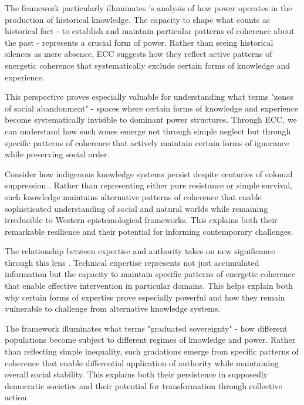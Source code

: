 The framework particularly illuminates \cite{trouillot1995silencing}'s analysis of how power operates in the production of historical knowledge. The capacity to shape what counts as historical fact - to establish and maintain particular patterns of coherence about the past - represents a crucial form of power. Rather than seeing historical silences as mere absence, ECC suggests how they reflect active patterns of energetic coherence that systematically exclude certain forms of knowledge and experience.

This perspective proves especially valuable for understanding what \cite{biehl2005vita} terms "zones of social abandonment" - spaces where certain forms of knowledge and experience become systematically invisible to dominant power structures. Through ECC, we can understand how such zones emerge not through simple neglect but through specific patterns of coherence that actively maintain certain forms of ignorance while preserving social order.

Consider how indigenous knowledge systems persist despite centuries of colonial suppression \cite{povinelli2002cunning}. Rather than representing either pure resistance or simple survival, such knowledge maintains alternative patterns of coherence that enable sophisticated understanding of social and natural worlds while remaining irreducible to Western epistemological frameworks. This explains both their remarkable resilience and their potential for informing contemporary challenges.

The relationship between expertise and authority takes on new significance through this lens \cite{latour1987science}. Technical expertise represents not just accumulated information but the capacity to maintain specific patterns of energetic coherence that enable effective intervention in particular domains. This helps explain both why certain forms of expertise prove especially powerful and how they remain vulnerable to challenge from alternative knowledge systems.

The framework illuminates what \cite{ong2006neoliberalism} terms "graduated sovereignty" - how different populations become subject to different regimes of knowledge and power. Rather than reflecting simple inequality, such gradations emerge from specific patterns of coherence that enable differential application of authority while maintaining overall social stability. This explains both their persistence in supposedly democratic societies and their potential for transformation through collective action.

